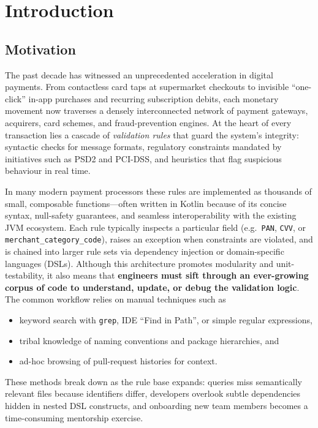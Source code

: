 \chapter{Introduction}
\label{ch:introduction}

\section{Motivation}
\label{sec:motivation}

The past decade has witnessed an unprecedented acceleration in digital payments.  
From contactless card taps at supermarket checkouts to invisible “one-click” in-app purchases and recurring subscription debits, each monetary movement now traverses a densely interconnected network of payment gateways, acquirers, card schemes, and fraud-prevention engines.  
At the heart of every transaction lies a cascade of \emph{validation rules} that guard the system’s integrity: syntactic checks for message formats, regulatory constraints mandated by initiatives such as PSD2 and PCI-DSS, and heuristics that flag suspicious behaviour in real time.

In many modern payment processors these rules are implemented as thousands of small, composable functions—often written in Kotlin because of its concise syntax, null-safety guarantees, and seamless interoperability with the existing JVM ecosystem.  
Each rule typically inspects a particular field (e.g.\ \texttt{PAN}, \texttt{CVV}, or \texttt{merchant\_category\_code}), raises an exception when constraints are violated, and is chained into larger rule sets via dependency injection or domain-specific languages (DSLs).  
Although this architecture promotes modularity and unit-testability, it also means that \textbf{engineers must sift through an ever-growing corpus of code to understand, update, or debug the validation logic}.  
The common workflow relies on manual techniques such as
\begin{itemize}
    \item keyword search with \texttt{grep}, IDE “Find in Path”, or simple regular expressions,
    \item tribal knowledge of naming conventions and package hierarchies, and
    \item ad-hoc browsing of pull-request histories for context.
\end{itemize}
These methods break down as the rule base expands: queries miss semantically relevant files because identifiers differ, developers overlook subtle dependencies hidden in nested DSL constructs, and onboarding new team members becomes a time-consuming mentorship exercise.

